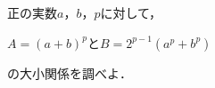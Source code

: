 \documentclass[../../main.tex]{subfiles}
\begin{document}
正の実数$a$，$b$，$p$に対して，

\begin{center}
  $A=(a+b)^p$と$B=2^{p-1}(a^p+b^p)$
\end{center}

の大小関係を調べよ．
\end{document}
